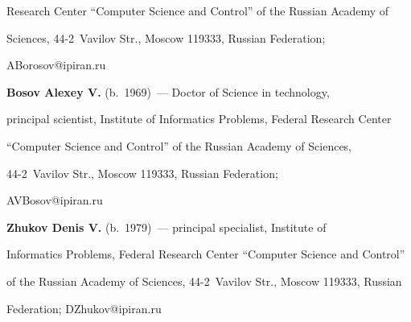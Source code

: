 Research Center ``Computer Science and Control'' of the Russian Academy of 


Sciences, 44-2~Vavilov Str., Moscow 119333, Russian Federation; 


\mbox{ABorosov@ipiran.ru}





     \vspace*{3pt}


     


     \noindent


     \textbf{Bosov Alexey V.} (b.\ 1969)~--- Doctor of Science in technology, 


principal scientist, Institute of Informatics Problems, Federal Research Center 


``Computer Science and Control'' of the Russian Academy of Sciences,  


44-2~Vavilov Str., Moscow 119333, Russian Federation; 


\mbox{AVBosov@ipiran.ru}


     


     


     \vspace*{3pt}


     


     \noindent


     \textbf{Zhukov Denis V.} (b.\ 1979)~--- principal specialist, Institute of 


Informatics Problems, Federal Research Center ``Computer Science and Control'' 


of the Russian Academy of Sciences, 44-2~Vavilov Str., Moscow 119333, Russian 


Federation; \mbox{DZhukov@ipiran.ru}





\label{end\stat}





\renewcommand{\bibname}{\protect\rm Литература} 


     


     


     


